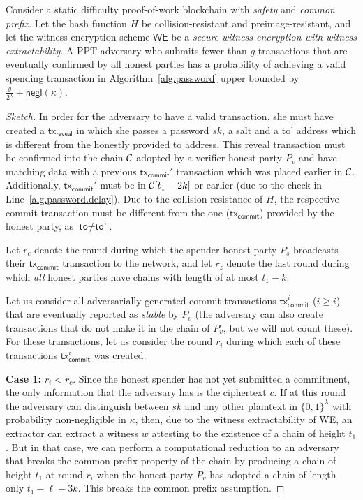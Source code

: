 \begin{lemma}\label{lem:rate-limit}
  Consider a static difficulty proof-of-work
  blockchain with \emph{safety} and \emph{common prefix}.
  Let the hash function $H$ be collision-resistant and preimage-resistant, and let
  the witness encryption scheme $\textsf{WE}$ be a \emph{secure witness encryption with witness extractability}.
  A PPT adversary who submits fewer than $g$ transactions that are
  eventually confirmed by all honest parties has a probability of
  achieving a valid spending transaction in Algorithm~\ref{alg.password}
  upper bounded by $\frac{g}{2^\lambda} + \textsf{negl}(\kappa)$.
\end{lemma}
\begin{proof}[Sketch]
  In order for the adversary to have a valid transaction, she must have created
  a $\textsf{tx}_\textsf{reveal}$ in which she passes a password $sk$, a \textsf{salt} and
  a \textsf{to'} address which is different from the honestly provided \textsf{to} address.
  This \textsf{reveal} transaction must be confirmed into the chain $\mathcal{C}$ adopted by a verifier honest
  party $P_v$ and have matching data with a previous $\textsf{tx}_\textsf{commit}'$ transaction which
  was placed earlier in $\mathcal{C}$. Additionally, $\textsf{tx}_\textsf{commit}'$ must be in $\mathcal{C}[t_1 - 2k]$
  or earlier (due to the check in Line~\ref{alg.password.delay}).
  Due to the collision resistance of $H$, the respective commit transaction must be different
  from the one ($\textsf{tx}_\textsf{commit}$) provided by the honest party, as
  $\textsf{to} \neq \textsf{to'}$.

  Let $r_c$ denote the round during which the spender honest party $P_s$ broadcasts
  their $\textsf{tx}_\textsf{commit}$ transaction to the network, and let $r_z$
  denote the last round during which \emph{all} honest parties have chains with length
  of at most $t_1 - k$.

  Let us consider all adversarially generated commit transactions $\textsf{tx}^i_\textsf{commit}$ ($i \geq i$)
  that are eventually reported as \emph{stable} by $P_v$
  (the adversary can also create transactions that do not make it in the chain of $P_v$,
  but we will not count these). For these transactions, let us consider the round $r_i$ during which
  each of these transactions $\textsf{tx}^i_\textsf{commit}$ was created.

  \textbf{Case 1:} $r_i < r_c$.
  Since the honest spender has not yet submitted a commitment,
  the only information that the adversary has is the ciphertext $c$. If at this round the
  adversary can distinguish between $sk$ and any other plaintext in $\{0, 1\}^\lambda$
  with probability non-negligible in $\kappa$, then, due to the witness extractability of
  \textsf{WE}, an extractor can extract a witness $w$ attesting to the existence of a chain
  of height $t_1$. But in that case, we can perform a computational reduction to an
  adversary that breaks the common prefix property of the chain by producing a chain of
  height $t_1$ at round $r_i$ when the honest party $P_v$ has adopted a chain of length
  only $t_1 - \ell - 3k$. This breaks the common prefix assumption.


\end{proof}
